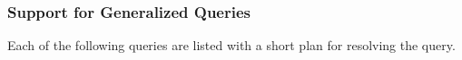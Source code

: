 \documentclass{cmspaper}
\begin{document}



\subsubsection{Support for Generalized Queries}


Each of the following queries are listed with a short plan for resolving the query.
\end{document}
